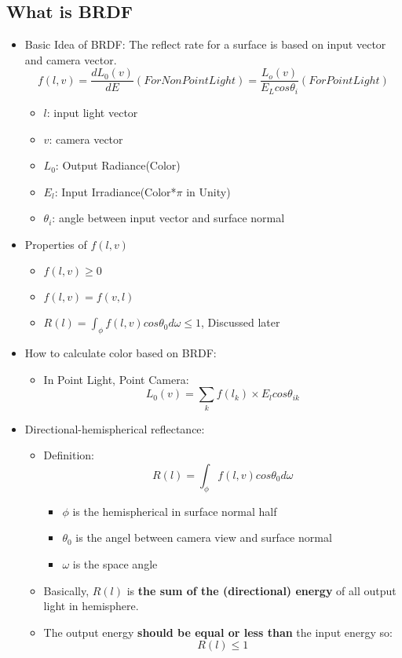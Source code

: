 \documentclass[cyan,normal,en]{elegantnote}
\begin{document}
\subsection{What is BRDF}
\begin{itemize}
	\item Basic Idea of BRDF: The reflect rate for a surface is based on input vector and camera vector.
	$$f(l,v)=\frac{dL_0(v)}{dE}(ForNonPointLight)=\frac{L_o(v)}{E_L cos\theta_i}(ForPointLight)$$
	\begin{itemize}
		\item $l$: input light vector
		\item $v$: camera vector
		\item $L_0$: Output Radiance(Color)
		\item $E_l$: Input Irradiance(Color*$\pi$ in Unity)
		\item $\theta_i$: angle between input vector and surface normal
	\end{itemize}
	\item Properties of $f(l,v)$
	\begin{itemize}
		\item $f(l,v)\geq 0$
		\item $f(l,v)=f(v,l)$
		\item $R(l)=\int_\phi f(l,v) cos\theta_0 d\omega \leq 1$, Discussed later
	\end{itemize}
	\item How to calculate color based on BRDF:
	\begin{itemize}
		\item In Point Light, Point Camera:
		$$L_0(v)=\sum_k f(l_k)\times E_l cos\theta_{ik}$$
	\end{itemize}
	\item Directional-hemispherical reflectance:
	\begin{itemize}
		\item Definition:
		$$R(l)=\int_\phi f(l,v) cos\theta_0 d\omega$$
		\begin{itemize}
			\item $\phi$ is the hemispherical in surface normal half
			\item $\theta_0$ is the angel between camera view and surface normal
			\item $\omega$ is the space angle
		\end{itemize}
		\item Basically, $R(l)$ is \textbf{the sum of the (directional) energy} of all output light in hemisphere.
		\item The output energy \textbf{should be equal or less than} the input energy so:
		$$R(l)\leq 1$$
	\end{itemize}
\end{itemize}
\end{document}
